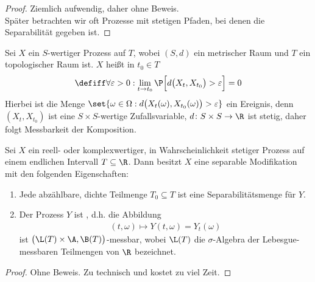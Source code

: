 \begin{proof}
	Ziemlich aufwendig, daher ohne Beweis.\\
	Später betrachten wir oft Prozesse mit stetigen Pfaden, bei denen die Separabilität gegeben ist.
\end{proof}

\begin{definition}\label{def2.1.8}
	Sei $X$ ein $S$-wertiger Prozess auf $T$, wobei $(S,d)$ ein metrischer Raum und $T$ ein topologischer Raum ist.
	$X$ heißt  in $t_0\in T$
	\begin{align*}
		\defiff\forall\varepsilon>0:\lim\limits_{t\to t_0}\P\Big[d\big(X_t,X_{t_0}\big)>\varepsilon\Big]=0
	\end{align*}
	Hierbei ist die Menge 
	$\set{\omega\in\Omega:d\big(X_t(\omega),X_{t_0}(\omega)\big)>\varepsilon}$ 
	ein Ereignis, denn $(X_t,X_{t_0})$ ist eine $S\times S$-wertige Zufallsvariable, $d\colon S\times S\to\R$ ist stetig, daher folgt Messbarkeit der Komposition.
\end{definition}

\begin{satz}\label{satz2.1.9}
	Sei $X$ ein reell- oder komplexwertiger, in Wahrscheinlichkeit stetiger Prozess auf einem endlichen Intervall $T\subseteq\R$.
	Dann besitzt $X$ eine separable Modifikation mit den folgenden Eigenschaften:
	\begin{enumerate}[label=(\roman*)]
		\item Jede abzählbare, dichte Teilmenge $T_0\subseteq T$ ist eine Separabilitätsmenge für $Y$. %
		\item Der Prozess $Y$ ist , d.h. die Abbildung
		\begin{align*}
			(t,\omega)\mapsto Y(t,\omega)=Y_t(\omega)
		\end{align*}
		ist $\big(\L(T)\times\A,\B(T)\big)$-messbar, wobei $\L(T)$ die $\sigma$-Algebra der Lebesgue-messbaren Teilmengen von $\R$ bezeichnet.
	\end{enumerate}
\end{satz}

\begin{proof}
	Ohne Beweis. Zu technisch und kostet zu viel Zeit.
\end{proof}

